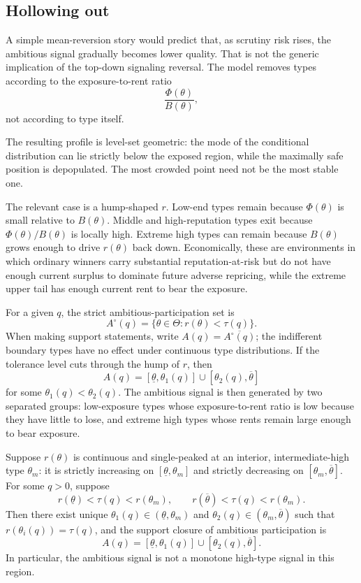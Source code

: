 \subsection{Hollowing out}

A simple mean-reversion story would predict that, as scrutiny risk rises, the ambitious signal gradually becomes lower quality. That is not the generic implication of the top-down signaling reversal. The model removes types according to the exposure-to-rent ratio
\[
\frac{\Phi(\theta)}{B(\theta)},
\]
not according to type itself.

The resulting profile is level-set geometric: the mode of the conditional distribution can lie strictly below the exposed region, while the maximally safe position is depopulated. The most crowded point need not be the most stable one.

The relevant case is a hump-shaped \(r\). Low-end types remain because \(\Phi(\theta)\) is small relative to \(B(\theta)\). Middle and high-reputation types exit because \(\Phi(\theta)/B(\theta)\) is locally high. Extreme high types can remain because \(B(\theta)\) grows enough to drive \(r(\theta)\) back down. Economically, these are environments in which ordinary winners carry substantial reputation-at-risk but do not have enough current surplus to dominate future adverse repricing, while the extreme upper tail has enough current rent to bear the exposure.

For a given \(q\), the strict ambitious-participation set is
\[
A^\circ(q)=\{\theta\in\Theta:r(\theta)<\tau(q)\}.
\]
When making support statements, write \(A(q)=\overline{A^\circ(q)}\); the indifferent boundary types have no effect under continuous type distributions. If the tolerance level cuts through the hump of \(r\), then
\[
A(q)=[\underline\theta,\theta_1(q)]\cup[\theta_2(q),\overline\theta]
\]
for some \(\theta_1(q)<\theta_2(q)\). The ambitious signal is then generated by two separated groups: low-exposure types whose exposure-to-rent ratio is low because they have little to lose, and extreme high types whose rents remain large enough to bear exposure.

\begin{proposition}
\label{thm:polarized-degradation}
Suppose \(r(\theta)\) is continuous and single-peaked at an interior, intermediate-high type \(\theta_m\): it is strictly increasing on \([\underline\theta,\theta_m]\) and strictly decreasing on \([\theta_m,\overline\theta]\). For some \(q>0\), suppose
\[
r(\underline\theta)<\tau(q)<r(\theta_m),
\qquad
r(\overline\theta)<\tau(q)<r(\theta_m).
\]
Then there exist unique \(\theta_1(q)\in(\underline\theta,\theta_m)\) and \(\theta_2(q)\in(\theta_m,\overline\theta)\) such that \(r(\theta_i(q))=\tau(q)\), and the support closure of ambitious participation is
\[
A(q)=[\underline\theta,\theta_1(q)]\cup[\theta_2(q),\overline\theta].
\]
In particular, the ambitious signal is not a monotone high-type signal in this region.
\end{proposition}

